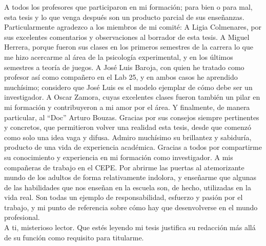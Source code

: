 \documentclass[
12pt, %
spanish, %
onehalfspacing, %
headsepline, %
]{MastersDoctoralThesis} %
\begin{document}
\begin{acknowledgements}
A todos los profesores que participaron en mi formación; para bien o para mal, esta tesis y lo que venga después son un producto parcial de sus enseñanzas. Particularmente agradezco a los miembros de mi comité: A Ligia Colmenares, por sus excelentes comentarios y observaciones al borrador de esta tesis. A Miguel Herrera, porque fueron sus clases en los primeros semestres de la carrera lo que me hizo acercarme al área de la psicología experimental, y en los últimos semestres a teoría de juegos. A José Luis Baroja, con quien he tratado como profesor así como compañero en el Lab 25, y en ambos casos he aprendido muchísimo; considero que José Luis es el modelo ejemplar de cómo debe ser un investigador. A Oscar Zamora, cuyas excelentes clases fueron también un pilar en mi formación y contribuyeron a mi amor por el área. Y finalmente, de manera particular, al “Doc” Arturo Bouzas. Gracias por sus consejos siempre pertinentes y concretos, que permitieron volver una realidad esta tesis, desde que comenzó como solo una idea vaga y difusa. Admiro muchísimo su brillantez y sabiduría, producto de una vida de experiencia académica. Gracias a todos por compartirme su conocimiento y experiencia en mi formación como investigador.
A mis compañeras de trabajo en el CEPE. Por abrirme las puertas al atemorizante mundo de los adultos de forma relativamente indolora, y enseñarme que algunas de las habilidades que nos enseñan en la escuela son, de hecho, utilizadas en la vida real. Son todas un ejemplo de responsabilidad, esfuerzo y pasión por el trabajo, y mi punto de referencia sobre cómo hay que desenvolverse en el mundo profesional.\\

A ti, misterioso lector. Que estés leyendo mi tesis justifica su redacción más allá de su función como requisito para titularme.\\
\end{acknowledgements}


\tableofcontents %

\listoffigures %

\listoftables %

\end{document}

